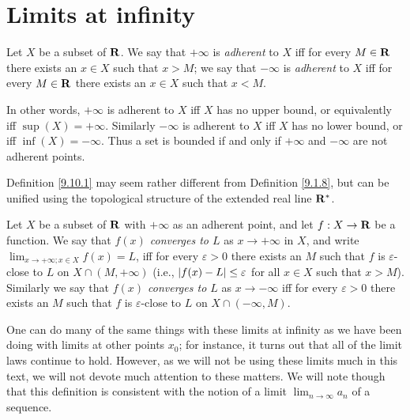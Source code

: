 \section{Limits at infinity}\label{sec 9.10}

\begin{definition}\label{9.10.1}
    Let \(X\) be a subset of \(\mathbf{R}\).
    We say that \(+\infty\) is \emph{adherent} to \(X\) iff for every \(M \in \mathbf{R}\) there exists an \(x \in X\) such that \(x > M\);
    we say that \(-\infty\) is \emph{adherent} to \(X\) iff for every \(M \in \mathbf{R}\) there exists an \(x \in X\) such that \(x < M\).
\end{definition}

\begin{note}
    In other words, \(+\infty\) is adherent to \(X\) iff \(X\) has no upper bound, or equivalently iff \(\sup(X) = +\infty\).
    Similarly \(-\infty\) is adherent to \(X\) iff \(X\) has no lower bound, or iff \(\inf(X) = -\infty\).
    Thus a set is bounded if and only if \(+\infty\) and \(-\infty\) are not adherent points.
\end{note}

\begin{remark}\label{9.10.2}
    Definition \ref{9.10.1} may seem rather different from Definition \ref{9.1.8}, but can be unified using the topological structure of the extended real line \(\mathbf{R}^*\).
\end{remark}

\begin{definition}\label{9.10.3}
    Let \(X\) be a subset of \(\mathbf{R}\) with \(+\infty\) as an adherent point, and let \(f : X \to \mathbf{R}\) be a function.
    We say that \emph{\(f(x)\) converges to \(L\)} as \(x \to +\infty\) in \(X\), and write \(\lim_{x \to +\infty ; x \in X} f(x) = L\), iff for every \(\varepsilon > 0\) there exists an \(M\) such that \(f\) is \(\varepsilon\)-close to \(L\) on \(X \cap (M, +\infty)\)
    (i.e., \(\left\lvert f(x) - L\right\rvert \leq \varepsilon\) for all \(x \in X\) such that \(x > M\)).
    Similarly we say that \emph{\(f(x)\) converges to \(L\)} as \(x \to -\infty\) iff for every \(\varepsilon > 0\) there exists an \(M\) such that \(f\) is \(\varepsilon\)-close to \(L\) on \(X \cap (-\infty, M)\).
\end{definition}

\begin{note}
    One can do many of the same things with these limits at infinity as we have been doing with limits at other points \(x_0\);
    for instance, it turns out that all of the limit laws continue to hold.
    However, as we will not be using these limits much in this text, we will not devote much attention to these matters.
    We will note though that this definition is consistent with the notion of a limit \(\lim_{n \to \infty} a_n\) of a sequence.
\end{note}

